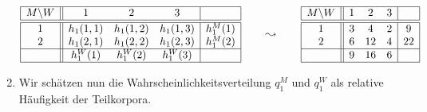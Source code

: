\documentclass[ngerman, a4paper, 12pt]{article}
\begin{document}
\begin{enumerate}[label=(\alph*), leftmargin=0pt]
 		\begin{equation*}
 		\begin{array}{|c||ccc|c|}
 		\hline
 		M \backslash W & 1 & 2 & 3 &\\ \hline \hline
 		1 & h_1(1,1) & h_1(1,2) & h_1(1,3) & h_1^M(1) \\
 		2 & h_1(2,1) & h_1(2,2) & h_1(2,3) & h_1^M(2) \\ \hline
 		& h_1^W(1) & h_1^W(2) & h_1^W(3) & \\ \hline
 		\end{array}
 		\qquad \leadsto \qquad 
 		\begin{array}{|c||ccc|c|}
 		\hline
 		M \backslash W & 1 & 2 & 3 &\\ \hline \hline
 		1 & 3 & 4 & 2 & 9 \\
 		2 & 6 & 12 & 4 & 22 \\ \hline
 		  & 9 & 16 & 6 & \\ \hline
 		\end{array}
 		\end{equation*}
 		\item Wir schätzen nun die Wahrscheinlichkeitsverteilung $q_1^M$ und $q_1^W$ als relative Häufigkeit der Teilkorpora.
	\end{enumerate}
\end{document}
